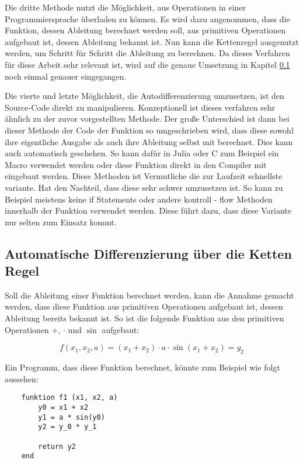 Die dritte Methode nutzt die Möglichkeit, aus Operationen 
in einer Programmiersprache überladen zu können.
Es wird dazu angenommen, dass die Funktion, dessen Ableitung berechnet werden soll, aus primitiven Operationen aufgebaut ist, dessen Ableitung bekannt ist.
Nun kann die Kettenregel ausgenutzt werden, um Schritt für Schritt die Ableitung zu berechnen.
Da dieses Verfahren für diese Arbeit sehr relevant ist, wird auf die genaue Umsetzung in Kapitel \ref{sec:ketten_regel} noch einmal genauer eingegangen.

Die vierte und letzte Möglichkeit, die Autodifferenzierung umzusetzen, ist den Source-Code direkt zu manipulieren.
Konzeptionell ist dieses verfahren sehr ähnlich zu der zuvor vorgestellten Methode. Der große Unterschied ist dann bei dieser Methode der Code der Funktion so umgeschrieben wird, dass diese sowohl ihre eigentliche Ausgabe als auch ihre Ableitung selbst mit berechnet.
Dies kann auch automatisch geschehen.
So kann dafür in Julia oder C zum Beispiel ein Macro verwendet werden oder diese Funktion direkt in den Compiler mit eingebaut werden.
Diese Methoden ist Vermutliche die zur Laufzeit schnellste variante.
Hat den Nachteil, dass diese sehr schwer umzusetzen ist.
So kann zu Beispiel meistens keine if Statements oder andere kontroll - flow Methoden innerhalb der Funktion verwendet werden. 
Diese führt dazu, dass diese Variante nur selten zum Einsatz kommt.

\subsection{Automatische Differenzierung über die Ketten Regel} \label{sec:ketten_regel}

Soll die Ableitung einer Funktion berechnet werden, 
kann die Annahme gemacht werden, 
dass diese Funktion aus primitiven Operationen aufgebaut ist, dessen Ableitung bereits bekannt ist.
So ist die folgende Funktion aus den primitiven Operationen $+$, $\cdot$  und $\sin$ aufgebaut:

$$
f(x_1, x_2, a) = (x_1 + x_2) \cdot a \cdot \sin(x_1 + x_2) = y_2
$$

Ein Programm, dass diese Funktion berechnet, könnte zum Beispiel wie folgt aussehen:

\begin{lstlisting}
    funktion f1 (x1, x2, a)
        y0 = x1 + x2
        y1 = a * sin(y0)
        y2 = y_0 * y_1
        
    	return y2
    end
\end{lstlisting}

